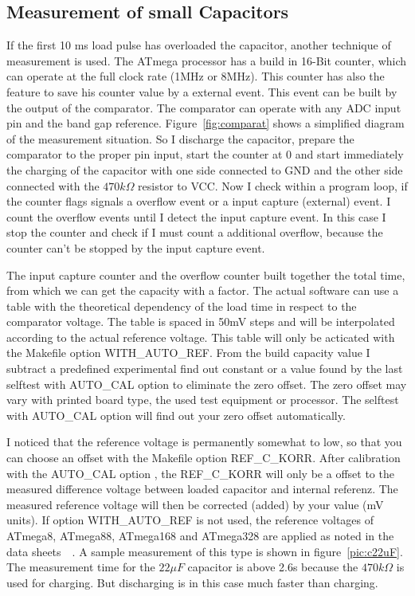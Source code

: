 \subsection{Measurement of small Capacitors}
If the first 10 ms load pulse has overloaded the capacitor, another technique of measurement is used.
The ATmega processor has a build in 16-Bit counter, which can operate at the full clock rate (1MHz or 8MHz).
This counter has also the feature to save his counter value by a external event.
This event can be built by the output of the comparator. 
The comparator can operate with any ADC input pin and the band gap reference.
Figure~\ref{fig:comparat} shows a simplified diagram of the measurement situation.
So I discharge the capacitor, prepare the comparator to the proper pin input, start the counter at 0 and
start immediately the charging of the capacitor with one side connected to GND and the other side connected with
the \(470k\Omega\) resistor to VCC.
Now I check within a program loop, if the counter flags signals a overflow event or a input capture (external) event.
I count the overflow events until I detect the input capture event.
In this case I stop the counter and check if I must count a additional overflow,
because the counter can't be stopped by the input capture event.


The input capture counter and the overflow counter built together the total time,
from which we can get the capacity with a factor.
The actual software can use a table with the theoretical  dependency of the load time in respect to the comparator voltage.
The table is spaced in 50mV steps and will be interpolated according to the actual reference voltage. 
This table will only be acticated with the Makefile option WITH\_AUTO\_REF.
From the build capacity value I subtract a predefined experimental find out constant or a value found by the last selftest
with AUTO\_CAL option to eliminate the zero offset. 
The zero offset may vary with printed board type, the used test equipment or processor.
The selftest with AUTO\_CAL option will find out your zero offset automatically.

I noticed that the reference voltage is permanently somewhat to low,
 so that you can choose an offset with the Makefile option REF\_C\_KORR.
After calibration with the AUTO\_CAL option , the REF\_C\_KORR will only be a offset to the measured difference voltage
between loaded capacitor and internal referenz.
The measured reference voltage will then be corrected (added) by your value (mV units).
If option WITH\_AUTO\_REF is not used, the reference voltages of ATmega8, ATmega88, ATmega168 and ATmega328
are applied as noted in the data sheets~\cite{ATmega8}~\cite{ATmega168}. 
A sample measurement of this type is shown in figure~\ref{pic:c22uF}.
The measurement time for the \(22 \mu F\) capacitor is above 2.6s because the \(470k\Omega\) is
used for charging. But discharging is in this case much faster than charging.

